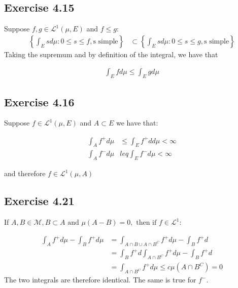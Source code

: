 \documentclass[11pt]{article}
\numberwithin{equation}{section}
\theoremstyle{plain}
\theoremstyle{definition}
\newcommand\braces[1]{\left\{ #1 \right\}}
\def\ss{\subset}
\newcommand{\1}{\mathbbm 1}
\begin{document}
\subsection*{Exercise 4.15}



Suppose $f,g \in \mathscr{L}^{1}(\mu, E)$ and $f \leq g$: 
\begin{align}
\braces{\int_{E} s d \mu: 0 \leq s \leq f, \text{s simple}} &\ss \braces{\int_{E} s d \mu: 0 \leq s \leq g, \text{s simple}}
\end{align}
Taking the supremum and by definition of the integral, we have that

\begin{align}
\int_{E} f d \mu \leq \int_{E} g d\mu
\end{align}

\subsection*{Exercise 4.16}
Suppose $f \in \mathscr{L}^{1}(\mu, E)$ and $A \ss E$
we have that: 


\begin{align}
\int_{A} f^+ d \mu &\leq \int_{E} f^+ d d \mu < \infty \\
\int_{A} f^- d \mu &leq \int_{E} f^- d \mu  < \infty
\end{align}


and therefore $f \in \mathscr{L}^{1}(\mu, A)$

\subsection*{Exercise 4.21}
If $A, B \in \mathcal{M}, B \subset A \text { and } \mu(A-B)=0, \text { then if } f \in \mathscr{L}^{1}$:

\begin{align}
\int_{A} f^+ d \mu - \int_{B} f^+ d \mu &= \int_{A\cap B \cup A \cap B^C} f^+ d \mu - \int_{B} f^+ d  \\
 		&= \int_{B} f^+ d \int_{A \cap B^C} f^+ d \mu - \int_{B} f^+ d \\
		& = \int_{A \cap B^C} f^+ d \mu \leq c \mu (A \cap B^C) = 0
\end{align}
The two integrals are therefore identical. The same is true for $f^-$.
\end{document}
